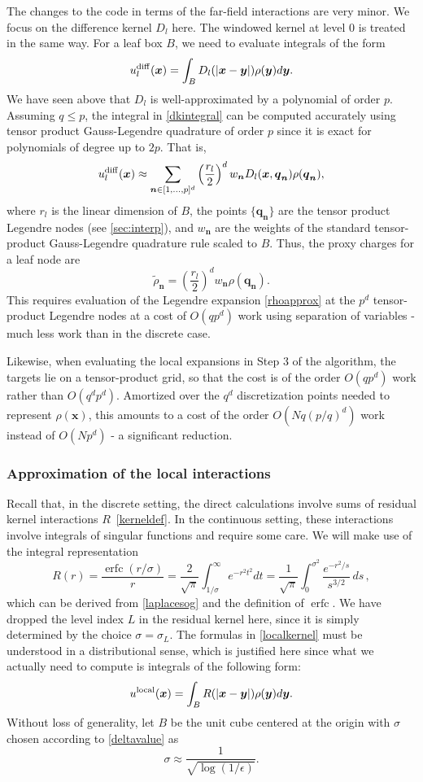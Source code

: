\documentclass[final,letterpaper]{siamart171218}
\DeclareMathOperator\erfc{erfc}
\newcommand{\be}{\begin{equation}}
\newcommand{\ee}{\end{equation}}
\newcommand{\x}{\boldsymbol{x}}
\newcommand{\y}{\boldsymbol{y}}
\newcommand{\bn}{\boldsymbol{n}}
\newcommand{\bq}{\boldsymbol{q}}
\newcommand{\cR}{r}
\begin{document}
The changes to the code in terms of the far-field interactions are very minor.
We focus on the difference kernel $D_l$ here. 
The windowed kernel at level 0 is treated in the same way. 
For a leaf box $B$, we 
need to evaluate integrals of the form
\be\label{dkintegral}
u_{l}^{\rm diff}(\x) = \int_B D_l(|\x-\y|) \rho(\y) d\y.
\ee
We have seen above that $D_l$ is well-approximated by a polynomial of order
$p$. Assuming $q\le p$, the integral in \cref{dkintegral} can
be computed accurately using tensor product Gauss-Legendre quadrature of order $p$
since it is exact for polynomials of degree up to $2p$. That is,
\be\label{dkintegral2}
u_{l}^{\rm diff}(\x) \approx \sum_{\bn \in [1,\dots,p]^d}
\left(\frac{\cR_l}{2}\right)^d w_{\bn}
D_l(\x,\bq_{\bn})\rho(\bq_{\bn}),
\ee
where $\cR_l$ is the linear dimension of $B$, the points
$\{ \bq_{\bn} \}$ are the tensor product Legendre nodes (see \cref{sec:interp}),
and $w_{\bn}$ are the weights of the 
standard tensor-product Gauss-Legendre quadrature rule
scaled to $B$. Thus, the proxy charges for a leaf node are 
\[ \tilde{\rho}_{\bn} = 
\left(\frac{\cR_l}{2}\right)^d w_{\bn}
\rho(\bq_{\bn}).
\]
This requires evaluation of the Legendre expansion \eqref{rhoapprox}
at the $p^d$ tensor-product Legendre nodes at a cost of $O(q p^d)$ work using
separation of variables - much less work than in the discrete case.

Likewise, when evaluating the local expansions in Step 3 of the algorithm, 
the targets lie on a tensor-product
grid, so that the cost is of the order $O(q p^d)$ work rather than $O(q^d p^d)$.
Amortized over the $q^d$ discretization points needed to represent $\rho(\x)$, this
amounts to a cost of the order $O(N q (p/q)^d)$ work instead of $O(N p^d)$ - a significant
reduction.

\subsubsection{Approximation of the local interactions}

Recall that, in the discrete setting, the direct calculations involve sums of
residual kernel interactions $R$~\cref{kerneldef}. In the continuous setting,
these interactions involve integrals of singular functions and require some care.
We will make use of the integral representation
\be\label{localkernel}
R(r)=\frac{\erfc(r/\sigma)}{r}=\frac{2}{\sqrt{\pi}}\int_{1/\sigma}^\infty e^{-r^2t^2}dt
=\frac{1}{\sqrt{\pi}}\int_0^{\sigma^2} \frac{e^{-r^2/s}}{s^{3/2}} \, ds \, ,
\ee
which can be derived from \eqref{laplacesog} and the definition of 
$\erfc$.  We have dropped the level index $L$ in the residual kernel here,
since it is simply determined by the choice $\sigma = \sigma_L$.
The formulas in \eqref{localkernel} must be understood in a distributional sense,
which is justified here since what we actually need to compute is 
integrals of the following form:
\be\label{lkintegral}
u^{\rm local}(\x) = \int_B R(|\x-\y|)\rho(\y)d\y.
\ee
Without loss of generality, let $B$ be the unit cube centered at the origin with $\sigma$
chosen according to \eqref{deltavalue} as
\be\label{deltavalue2}
\sigma\approx \frac{1}{\sqrt{\log(1/\epsilon)}}.
\ee
\end{document}
